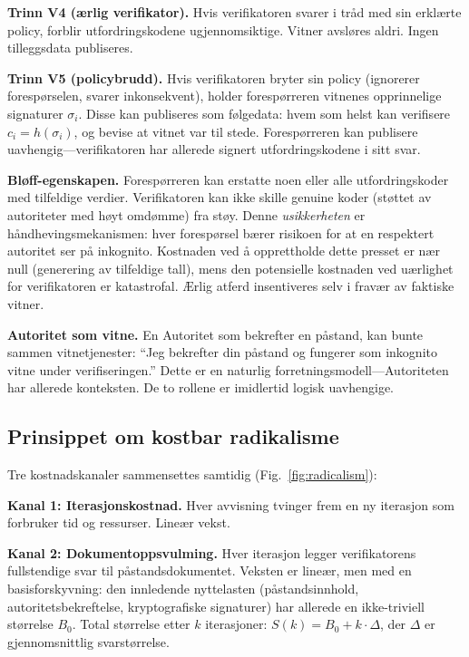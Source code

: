 \documentclass[11pt,a4paper,twocolumn]{article}
\begin{document}
\textbf{Trinn V4 (ærlig verifikator).} Hvis verifikatoren svarer i tråd med sin erklærte policy, forblir utfordringskodene ugjennomsiktige. Vitner avsløres aldri. Ingen tilleggsdata publiseres.

\textbf{Trinn V5 (policybrudd).} Hvis verifikatoren bryter sin policy (ignorerer forespørselen, svarer inkonsekvent), holder forespørreren vitnenes opprinnelige signaturer $\sigma_i$. Disse kan publiseres som følgedata: hvem som helst kan verifisere $c_i = h(\sigma_i)$, og bevise at vitnet var til stede. Forespørreren kan publisere uavhengig---verifikatoren har allerede signert utfordringskodene i sitt svar.

\textbf{Bløff-egenskapen.} Forespørreren kan erstatte noen eller alle utfordringskoder med tilfeldige verdier. Verifikatoren kan ikke skille genuine koder (støttet av autoriteter med høyt omdømme) fra støy. Denne \emph{usikkerheten} er håndhevingsmekanismen: hver forespørsel bærer risikoen for at en respektert autoritet ser på inkognito. Kostnaden ved å opprettholde dette presset er nær null (generering av tilfeldige tall), mens den potensielle kostnaden ved uærlighet for verifikatoren er katastrofal. Ærlig atferd insentiveres selv i fravær av faktiske vitner.

\textbf{Autoritet som vitne.} En Autoritet som bekrefter en påstand, kan bunte sammen vitnetjenester: ``Jeg bekrefter din påstand og fungerer som inkognito vitne under verifiseringen.'' Dette er en naturlig forretningsmodell---Autoriteten har allerede konteksten. De to rollene er imidlertid logisk uavhengige.

\subsection{Prinsippet om kostbar radikalisme}

Tre kostnadskanaler sammensettes samtidig (Fig.~\ref{fig:radicalism}):

\textbf{Kanal 1: Iterasjonskostnad.} Hver avvisning tvinger frem en ny iterasjon som forbruker tid og ressurser. Lineær vekst.

\textbf{Kanal 2: Dokumentoppsvulming.} Hver iterasjon legger verifikatorens fullstendige svar til påstandsdokumentet. Veksten er lineær, men med en basisforskyvning: den innledende nyttelasten (påstandsinnhold, autoritetsbekreftelse, kryptografiske signaturer) har allerede en ikke-triviell størrelse $B_0$. Total størrelse etter $k$ iterasjoner: $S(k) = B_0 + k \cdot \Delta$, der $\Delta$ er gjennomsnittlig svarstørrelse.
\end{document}
